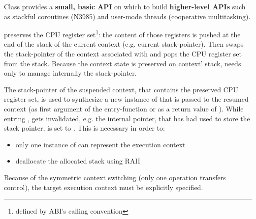 Class \ectx provides a {\bfseries small, basic API} on which to build {\bfseries
higher-level APIs} such as stackful coroutines (N3985\cite{N3985}) and user-mode
threads (cooperative multitasking).


 preserves the CPU register
set\footnote{defined by ABI's calling convention}: the content of those
registers is pushed at the end of the stack of the current context (e.g. current
stack-pointer). Then \ectxop swaps the stack-pointer of the context associated
with  and pops the CPU register set from the stack.
Because the context state is preserved on context' stack, \ectx needs only to
manage internally the stack-pointer.


The stack-pointer of the suspended context, that contains the preserved CPU
register set, is used to synthesize a new instance of \ectx that is passed to
the resumed context (as first argument of the entry-function or as a return
value of \ectxop).
While entring ,  gets
invalidated, e.g. the internal pointer, that has had used to store the stack
pointer, is set to .
This is necessary in order to:
\begin{itemize}
    \item   only one instance of \ectx can represent the execution context
    \item   deallocate the allocated stack using RAII
\end{itemize}

Because of the symmetric context switching (only one operation transfers
control), the target execution context must be explicitly specified.


